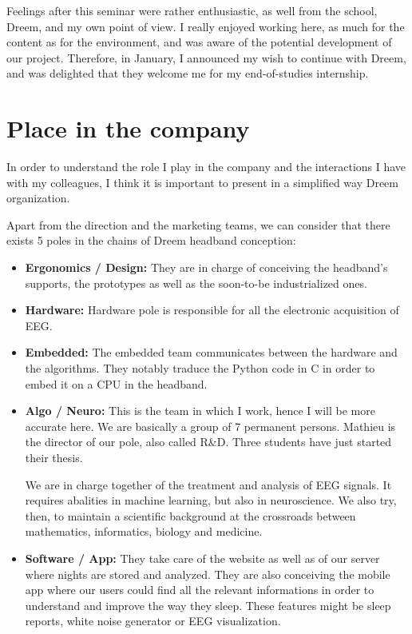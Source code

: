 \documentclass[12pt]{report}
\begin{document}
Feelings after this seminar were rather enthusiastic, as well from the school, Dreem, and my own point of view. I really enjoyed working here, as much for the content as for the environment, and was aware of the potential development of our project. Therefore, in January, I announced my wish to continue with Dreem, and was delighted that they welcome me for my end-of-studies internship.

\section{Place in the company}

In order to understand the role I play in the company and the interactions I have with my colleagues, I think it is important to present in a simplified way Dreem organization.

Apart from the direction and the marketing teams, we can consider that there exists 5 poles in the chains of Dreem headband conception:

\begin{itemize}
\item \textbf{Ergonomics / Design:} They are in charge of conceiving the headband's supports, the prototypes as well as the soon-to-be industrialized ones.
\item \textbf{Hardware:} Hardware pole is responsible for all the electronic acquisition of EEG.
\item \textbf{Embedded:} The embedded team communicates between the hardware and the algorithms. They notably traduce the Python code in C in order to embed it on a CPU in the headband.
\item \textbf{Algo / Neuro:} This is the team in which I work, hence I will be more accurate here. We are basically a group of 7 permanent persons. Mathieu is the director of our pole, also called R\&D. Three students have just started their thesis.

We are in charge together of the treatment and analysis of EEG signals. It requires abalities in machine learning, but also in neuroscience. We also try, then, to maintain a scientific background at the crossroads between mathematics, informatics, biology and medicine.

\item \textbf{Software / App:} They take care of the website as well as of our server where nights are stored and analyzed. They are also conceiving the mobile app where our users could find all the relevant informations in order to understand and improve the way they sleep. These features might be sleep reports, white noise generator or EEG visualization.

\end{itemize}
\end{document}
